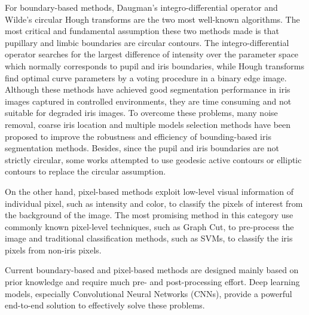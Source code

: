\documentclass[journal]{IEEEtran}
\begin{document}
For boundary-based methods, Daugman's integro-differential operator\cite{Daugman_id} and Wilde's circular Hough transforms\cite{wildes1997iris} are the two most well-known algorithms. The most critical and fundamental assumption these two methods made is that pupillary and limbic boundaries are circular contours. The integro-differential operator searches for the largest difference of intensity over the parameter space which normally corresponds to pupil and iris boundaries, while Hough transforms find optimal curve parameters by a voting procedure in a binary edge image. Although these methods have achieved good segmentation performance in iris images captured in controlled environments, they are time consuming and not suitable for degraded iris images. To overcome these problems, many noise removal\cite{Zhao2015An}, coarse iris location\cite{haindl2015unsupervised,gangwar2016irisseg} and multiple models selection\cite{HU201524} methods have been proposed to improve the robustness and efficiency of bounding-based iris segmentation methods. Besides, since the pupil and iris boundaries are not strictly circular, some works attempted to use geodesic active contours \cite{shah2009iris} or elliptic contours \cite{Banerjee2016} to replace the circular assumption.

On the other hand, pixel-based methods exploit low-level visual information of individual pixel, such as intensity and color, to classify the pixels of interest from the background of the image. The most promising method in this category use commonly known pixel-level techniques, such as Graph Cut\cite{RADMAN201760,Banerjee2016}, to pre-process the image and traditional classification methods, such as SVMs\cite{rongnian2011improving}, to classify the iris pixels from non-iris pixels.

Current boundary-based and pixel-based methods are designed mainly based on prior knowledge and require much pre- and post-processing effort. Deep learning models, especially Convolutional Neural Networks (CNNs), provide a powerful end-to-end solution to effectively solve these problems.
\end{document}
